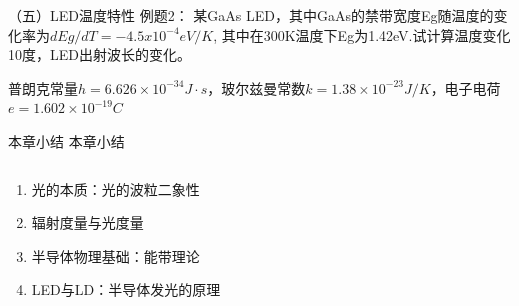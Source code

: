 \documentclass[trans]{beamer} %
\begin{document}
 \begin{frame}{（五）LED温度特性}
 例题2：
某GaAs LED，其中GaAs的禁带宽度Eg随温度的变化率为$dEg/dT=-4.5x10^{-4}eV/K$, 其中在300K温度下Eg为1.42eV.试计算温度变化10度，LED出射波长的变化。
 
普朗克常量$h=6.626\times 10^{-34} J\cdot s $，玻尔兹曼常数$k=1.38\times 10^{-23}J/K$，电子电荷$e=1.602\times 10^{-19} C$
 \end{frame}  

\begin{frame}{本章小结}
本章小结
    \begin{columns}
        \begin{column}{0.9\textwidth}
        
        \begin{enumerate}[(1)]
    \item 光的本质：光的波粒二象性
    \item 辐射度量与光度量
    \item 半导体物理基础：能带理论
    \item LED与LD：半导体发光的原理
    \end{enumerate}
        \end{column}
        \begin{column}{0.1\textwidth}
    
        \end{column}
        \end{columns}
    
    
\end{frame} 
 
\end{document}
